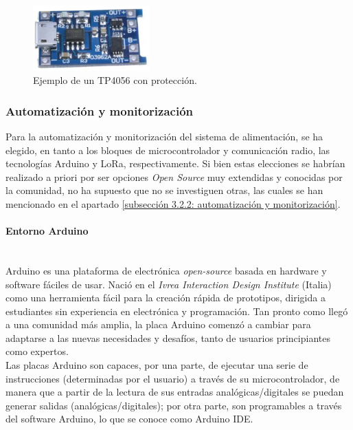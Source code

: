 \documentclass[12pt]{article}
\newcommand{\subsubsubsection}[1]{\paragraph{#1}\mbox{}\\}
\begin{document}
	\begin{figure}[h]
		\begin{center}
			\includegraphics[width=0.4\textwidth]{img/tp4056_withProtection.png}
			\caption{Ejemplo de un TP4056 con protección.}
			\label{TP4056 con protección}
		\end{center}
	\end{figure}
	

	\subsubsection{Automatización y monitorización}
	
	\noindent Para la automatización y monitorización del sistema de alimentación, se ha elegido, en tanto a los bloques de microcontrolador y  comunicación radio, las tecnologías Arduino y LoRa, respectivamente. Si bien estas elecciones se habrían realizado a priori por ser opciones \textit{Open Source} muy extendidas y conocidas por la comunidad, no ha supuesto que no se investiguen otras, las cuales se han mencionado en el apartado \ref{subsección 3.2.2: automatización y monitorización}.
	
	\subsubsubsection{Entorno Arduino}
	
	
	\noindent Arduino es una plataforma de electrónica \textit{open-source} basada en hardware y software fáciles de usar. Nació en el \textit{Ivrea Interaction Design Institute} (Italia) como una herramienta fácil para la creación rápida de prototipos, dirigida a estudiantes sin experiencia en electrónica y programación. Tan pronto como llegó a una comunidad más amplia, la placa Arduino comenzó a cambiar para adaptarse a las nuevas necesidades y desafíos, tanto de usuarios principiantes como expertos. \\
	
	\noindent Las placas Arduino son capaces, por una parte, de ejecutar una serie de instrucciones (determinadas por el usuario) a través de su microcontrolador, de manera que a partir de la lectura de sus entradas analógicas/digitales se puedan generar salidas (analógicas/digitales); por otra parte, son programables a través del software Arduino, lo que se conoce como Arduino IDE. \\
	
\end{document}
